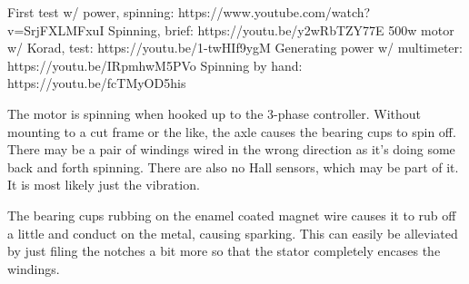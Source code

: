 \documentclass[11pt]{article} %
\begin{document}
First test w/ power, spinning: https://www.youtube.com/watch?v=SrjFXLMFxuI
Spinning, brief: https://youtu.be/y2wRbTZY77E
500w motor w/ Korad, test: https://youtu.be/1-twHIf9ygM
Generating power w/ multimeter: https://youtu.be/IRpmhwM5PVo
Spinning by hand: https://youtu.be/fcTMyOD5his




The motor is spinning when hooked up to the 3-phase controller. Without mounting to a cut frame or the like, the axle causes the bearing cups to spin off. There may be a pair of windings wired in the wrong direction as it’s doing some back and forth spinning. There are also no Hall sensors, which may be part of it. It is most likely just the vibration.

The bearing cups rubbing on the enamel coated magnet wire causes it to rub off a little and conduct on the metal, causing sparking. This can easily be alleviated by just filing the notches a bit more so that the stator completely encases the windings.
\end{document}
